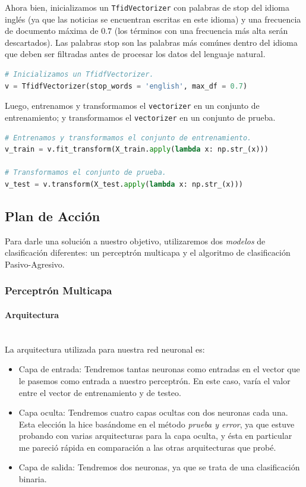 \documentclass[letterpaper,11pt]{article}
\newcommand{\subsubsubsection}[1]{\paragraph{#1}\mbox{}\\}
\begin{document}
Ahora bien, inicializamos un \texttt{TfidVectorizer} con palabras de stop  del 
idioma inglés (ya que las noticias se encuentran escritas en este idioma) y una
frecuencia de documento máxima de $0.7$ (los términos con una frecuencia más 
alta serán descartados). Las palabras stop son las palabras más comúnes dentro 
del idioma que deben ser filtradas antes de procesar los datos del lenguaje 
natural. 

\begin{lstlisting}[language = Python]
# Inicializamos un TfidfVectorizer. 
v = TfidfVectorizer(stop_words = 'english', max_df = 0.7)
\end{lstlisting}

Luego, entrenamos y transformamos el \texttt{vectorizer} en un conjunto de 
entrenamiento; y transformamos el \texttt{vectorizer} en un conjunto de prueba.
\begin{lstlisting}[language = Python]
# Entrenamos y transformamos el conjunto de entrenamiento.
v_train = v.fit_transform(X_train.apply(lambda x: np.str_(x))) 

# Transformamos el conjunto de prueba.
v_test = v.transform(X_test.apply(lambda x: np.str_(x)))
\end{lstlisting}

\subsection{Plan de Acción}
Para darle una solución a nuestro objetivo, utilizaremos dos \textit{modelos}
de clasificación diferentes: un perceptrón multicapa y el algoritmo de 
clasificación Pasivo-Agresivo.

\subsubsection{Perceptrón Multicapa}

\subsubsubsection{Arquitectura}
La arquitectura utilizada para nuestra red neuronal es:
\begin{itemize}
    \item Capa de entrada: Tendremos tantas neuronas como entradas en el 
    vector que le pasemos como entrada a nuestro perceptrón. En este caso, 
    varía el valor entre el vector de entrenamiento y de testeo. 

    \item Capa oculta: Tendremos cuatro capas ocultas con dos neuronas cada 
    una. Esta elección la hice basándome en el método \textit{prueba y error}, 
    ya que estuve probando con varias arquitecturas para la capa oculta, y 
    ésta en particular me pareció rápida en comparación a las otras 
    arquitecturas que probé. 

    \item Capa de salida: Tendremos dos neuronas, ya que se trata de una 
    clasificación binaria.
\end{itemize}
\end{document}
